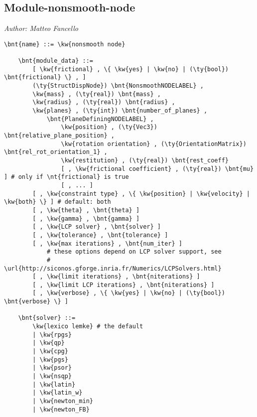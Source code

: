 \subsection{Module-nonsmooth-node}
\emph{Author: Matteo Fancello}
\begin{Verbatim}[commandchars=\\\{\}]
    \bnt{name} ::= \kw{nonsmooth node}

    \bnt{module_data} ::=
        [ \kw{frictional} , \{ \kw{yes} | \kw{no} | (\ty{bool}) \bnt{frictional} \} , ]
        (\ty{StructDispNode}) \bnt{NonsmoothNODELABEL} ,
        \kw{mass} , (\ty{real}) \bnt{mass} ,
        \kw{radius} , (\ty{real}) \bnt{radius} ,
        \kw{planes} , (\ty{int}) \bnt{number_of_planes} ,
            \bnt{PlaneDefiningNODELABEL} ,
                \kw{position} , (\ty{Vec3}) \bnt{relative_plane_position} ,
                \kw{rotation orientation} , (\ty{OrientationMatrix}) \bnt{rel_rot_orientation_1} ,
                \kw{restitution} , (\ty{real}) \bnt{rest_coeff}
                [ , \kw{frictional coefficient} , (\ty{real}) \bnt{mu} ] # only if \nt{frictional} is true
                [ , ... ]
        [ , \kw{constraint type} , \{ \kw{position} | \kw{velocity} | \kw{both} \} ] # default: both
        [ , \kw{theta} , \bnt{theta} ]
        [ , \kw{gamma} , \bnt{gamma} ]
        [ , \kw{LCP solver} , \bnt{solver} ]
        [ , \kw{tolerance} , \bnt{tolerance} ]
        [ , \kw{max iterations} , \bnt{num_iter} ]
            # these options depend on LCP solver support, see
            # \url{http://siconos.gforge.inria.fr/Numerics/LCPSolvers.html}
        [ , \kw{limit iterations} , \bnt{niterations} ]
        [ , \kw{limit LCP iterations} , \bnt{niterations} ]
        [ , \kw{verbose} , \{ \kw{yes} | \kw{no} | (\ty{bool}) \bnt{verbose} \} ]

    \bnt{solver} ::=
        \kw{lexico lemke} # the default
        | \kw{rpgs}
        | \kw{qp}
        | \kw{cpg}
        | \kw{pgs}
        | \kw{psor}
        | \kw{nsqp}
        | \kw{latin}
        | \kw{latin_w}
        | \kw{newton_min}
        | \kw{newton_FB}
\end{Verbatim}

